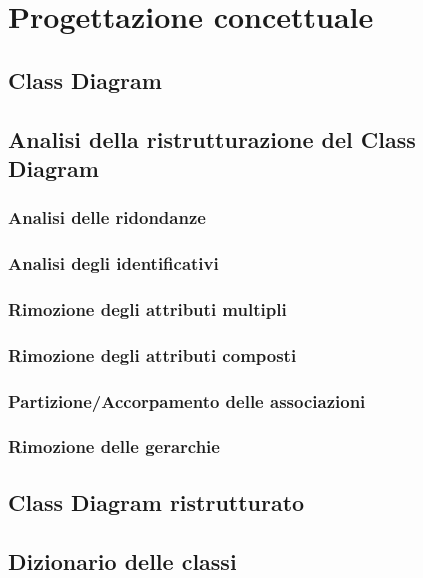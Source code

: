 \chapter{Progettazione concettuale}
    \section{Class Diagram}
        
    \section{Analisi della ristrutturazione del Class Diagram}
        
        \subsection{Analisi delle ridondanze}
            
        \subsection{Analisi degli identificativi}
            
        \subsection{Rimozione degli attributi multipli}
            
        \subsection{Rimozione degli attributi composti}
            
        \subsection{Partizione/Accorpamento delle associazioni}
            
        \subsection{Rimozione delle gerarchie}
    
    \section{Class Diagram ristrutturato}
  
    \section{Dizionario delle classi}
    




